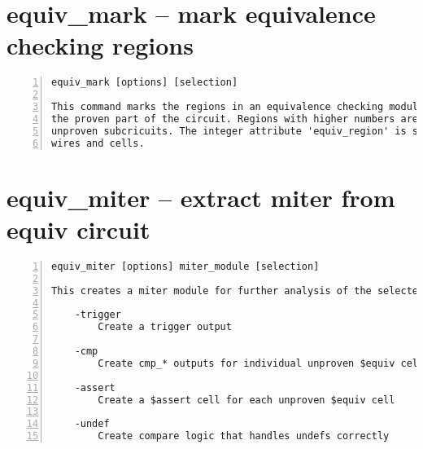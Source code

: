 \section{equiv\_mark -- mark equivalence checking regions}
\label{cmd:equiv_mark}
\begin{lstlisting}[numbers=left,frame=single]
    equiv_mark [options] [selection]

This command marks the regions in an equivalence checking module. Region 0 is
the proven part of the circuit. Regions with higher numbers are connected
unproven subcricuits. The integer attribute 'equiv_region' is set on all
wires and cells.
\end{lstlisting}

\section{equiv\_miter -- extract miter from equiv circuit}
\label{cmd:equiv_miter}
\begin{lstlisting}[numbers=left,frame=single]
    equiv_miter [options] miter_module [selection]

This creates a miter module for further analysis of the selected $equiv cells.

    -trigger
        Create a trigger output

    -cmp
        Create cmp_* outputs for individual unproven $equiv cells

    -assert
        Create a $assert cell for each unproven $equiv cell

    -undef
        Create compare logic that handles undefs correctly
\end{lstlisting}

